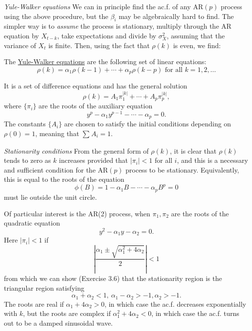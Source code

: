 \textit{Yule-Walker equations}
We can in principle find the ac.f. of any $\mathrm{AR}(p)$ process using the above procedure, but the $\beta_i$ 
may be algebraically hard to find. The simpler way is to \textit{assume} the process is stationary, multiply 
through the AR equation by $X_{t-k}$, take expectations and divide by $\sigma_X^2$, assuming that the variance 
of $X_t$ is finite. Then, using the fact that $\rho(k)$ is even, we find:

\begin{definition*}[]
The \underline{Yule-Walker equations} are the following set of linear equations:
\[ \rho(k) = \alpha_1 \rho(k - 1) + \cdots + \alpha_p \rho(k - p) \text{ for all } k = 1, 2, \dots \]
\end{definition*}

It is a set of difference equations and has the general solution 
\[ \rho(k) = A_1 \pi_1^{|k|} + \cdots + A_p \pi_p^{|k|}, \]
where $\{ \pi_i \}$ are the roots of the auxiliary equation 
\[ y^p - \alpha_1 y^{p-1} - \cdots - \alpha_p = 0. \]
The constants $\{ A_i \}$ are chosen to satisfy the initial conditions depending on $\rho(0) = 1$, meaning that 
$\sum_{}^{}A_i = 1$.

\textit{Stationarity conditions}
From the general form of $\rho(k)$, it is clear that $\rho(k)$ tends to zero as $k$ increases provided that 
$|\pi_i| < 1$ for all $i$, and this is a necessary and sufficient condition for the $\mathrm{AR}(p)$ process to 
be stationary. Equivalently, this is equal to the roots of the equation 
\[ \phi(B) = 1 - \alpha_1 B - \cdots - \alpha_p B^p = 0 \]
must lie outside the unit circle.

Of particular interest is the AR(2) process, when $\pi_1, \pi_2$ are the roots of the quadratic equation 
\[ y^2 - \alpha_1 y - \alpha_2 = 0. \]
Here $|\pi_i| < 1$ if 
\[ \left| \frac{\alpha_1 \pm \sqrt{\alpha_1^2 + 4 \alpha_2}}{2} \right| < 1 \]
from which we can show (Exercise 3.6) that the stationarity region is the triangular region satisfying 
\[ \alpha_1 + \alpha_2 < 1, \ \alpha_1 - \alpha_2 > -1, \alpha_2 > -1. \]
The roots are real if $\alpha_1 + 4 \alpha_2 > 0$, in which case the ac.f. decreases exponentially with $k$, but 
the roots are complex if $\alpha_1^2 + 4 \alpha_2 < 0$, in which case the ac.f. turns out to be a damped 
sinusoidal wave.

